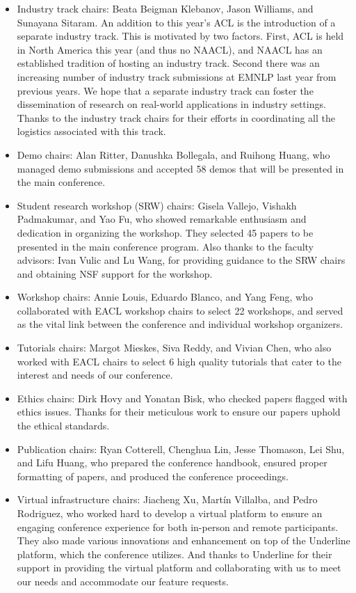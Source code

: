 \begin{itemize}
\item Industry track chairs: Beata Beigman Klebanov, Jason Williams, and Sunayana Sitaram. An addition to this year’s ACL is the introduction of a separate industry track. This is motivated by two factors. First, ACL is held in North America this year (and thus no NAACL), and NAACL has an established tradition of hosting an industry track. Second there was an increasing number of industry track submissions at EMNLP last year from previous years. We hope that a separate industry track can foster the dissemination of research on real-world applications in industry settings. Thanks to the industry track chairs for their efforts in coordinating all the logistics associated with this track.
\item Demo chairs: Alan Ritter, Danushka Bollegala, and Ruihong Huang, who managed demo submissions and accepted 58 demos that will be presented in the main conference.
\item Student research workshop (SRW) chairs: Gisela Vallejo, Vishakh Padmakumar, and Yao Fu, who showed remarkable enthusiasm and dedication in organizing the workshop. They selected 45 papers to be presented in the main conference program. Also thanks to the faculty advisors: Ivan Vulic and Lu Wang, for providing guidance to the SRW chairs and obtaining NSF support for the workshop. 
\item Workshop chairs: Annie Louis, Eduardo Blanco, and Yang Feng, who collaborated with EACL workshop chairs to select 22 workshops, and served as the vital link between the conference and individual workshop organizers.
\item Tutorials chairs: Margot Mieskes, Siva Reddy, and Vivian Chen, who also worked with EACL chairs to select 6 high quality tutorials that cater to the interest and needs of our conference.
\item Ethics chairs: Dirk Hovy and Yonatan Bisk, who checked papers flagged with ethics issues. Thanks for their meticulous work to ensure our papers uphold the ethical standards.
\item Publication chairs: Ryan Cotterell, Chenghua Lin, Jesse Thomason, Lei Shu, and Lifu Huang, who prepared the conference handbook, ensured proper formatting of papers, and produced the conference proceedings.
\item Virtual infrastructure chairs: Jiacheng Xu, Martín Villalba, and Pedro Rodriguez, who worked hard to develop a virtual platform to ensure an engaging conference experience for both in-person and remote participants. They also made various innovations and enhancement on top of the Underline platform, which the conference utilizes. And thanks to Underline for their support in providing the virtual platform and collaborating with us to meet our needs and accommodate our feature requests. 

\end{itemize}
